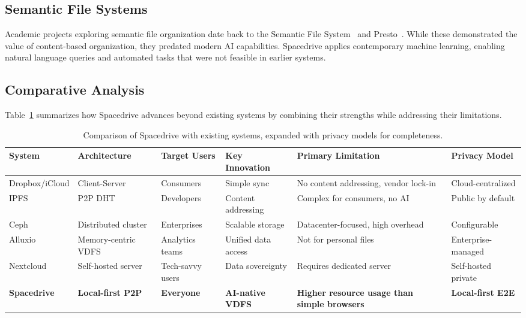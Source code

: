 \documentclass[sigconf]{acmart}
\begin{document}
\subsection{Semantic File Systems}
Academic projects exploring semantic file organization date back to the Semantic File System~\cite{gifford_sfs_1991} and Presto~\cite{dourish_presto_1999}. While these demonstrated the value of content-based organization, they predated modern AI capabilities. Spacedrive applies contemporary machine learning, enabling natural language queries and automated tasks that were not feasible in earlier systems.

\subsection{Comparative Analysis}

Table~\ref{tab:comparison} summarizes how Spacedrive advances beyond existing systems by combining their strengths while addressing their limitations.

\begin{table}[ht]
\centering
\footnotesize
\setlength{\tabcolsep}{4pt}
\begin{tabular}{@{}p{2.2cm}p{2.5cm}p{2cm}p{2.5cm}p{4.5cm}p{2.3cm}@{}}
\toprule
\textbf{System} & \textbf{Architecture} & \textbf{Target Users} & \textbf{Key Innovation} & \textbf{Primary Limitation} & \textbf{Privacy Model} \\
\midrule
Dropbox/\newline iCloud & Client-Server & Consumers & Simple sync & No content addressing, vendor lock-in & Cloud-\newline centralized \\
IPFS & P2P DHT & Developers & Content addressing & Complex for consumers, no AI & Public by default \\
Ceph & Distributed cluster & Enterprises & Scalable storage & Datacenter-focused, high overhead & Configurable \\
Alluxio & Memory-centric VDFS & Analytics teams & Unified data access & Not for personal files & Enterprise-\newline managed \\
Nextcloud & Self-hosted server & Tech-savvy users & Data sovereignty & Requires dedicated server & Self-hosted private \\
\textbf{Spacedrive} & \textbf{Local-first P2P} & \textbf{Everyone} & \textbf{AI-native VDFS} & \textbf{Higher resource usage than simple browsers} & \textbf{Local-first E2E} \\
\bottomrule
\end{tabular}
\caption{Comparison of Spacedrive with existing systems, expanded with privacy models for completeness.}
\label{tab:comparison}
\end{table}
\end{document}
